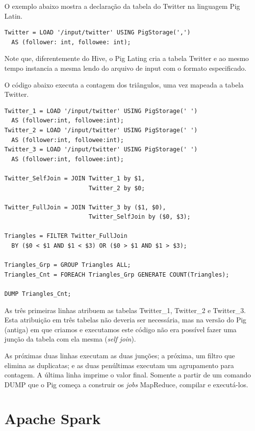 O exemplo abaixo mostra a declaração da tabela do Twitter na linguagem Pig Latin.

\begin{verbatim}
Twitter = LOAD '/input/twitter' USING PigStorage(',') 
  AS (follower: int, followee: int);
\end{verbatim}

Note que, diferentemente do Hive, o Pig Lating cria a tabela Twitter e ao mesmo tempo instancia 
a mesma lendo do arquivo de input com o formato especificado.

O código abaixo executa a contagem dos triângulos, uma vez mapeada a tabela Twitter.

\begin{verbatim}
Twitter_1 = LOAD '/input/twitter' USING PigStorage(' ') 
  AS (follower:int, followee:int);
Twitter_2 = LOAD '/input/twitter' USING PigStorage(' ') 
  AS (follower:int, followee:int);
Twitter_3 = LOAD '/input/twitter' USING PigStorage(' ') 
  AS (follower:int, followee:int);

Twitter_SelfJoin = JOIN Twitter_1 by $1, 
                        Twitter_2 by $0;

Twitter_FullJoin = JOIN Twitter_3 by ($1, $0), 
                        Twitter_SelfJoin by ($0, $3);

Triangles = FILTER Twitter_FullJoin 
  BY ($0 < $1 AND $1 < $3) OR ($0 > $1 AND $1 > $3);

Triangles_Grp = GROUP Triangles ALL;
Triangles_Cnt = FOREACH Triangles_Grp GENERATE COUNT(Triangles);

DUMP Triangles_Cnt;
\end{verbatim}

As três primeiras linhas atribuem as tabelas Twitter\_1, Twitter\_2 e Twitter\_3. Esta atribuição 
em três tabelas não deveria ser necessária, mas na versão do Pig (antiga) em que criamos e executamos
este código não era possível fazer uma junção da tabela com ela mesma (\emph{self join}).

As próximas duas linhas executam as duas junções; a próxima, um filtro que elimina as duplicatas;
e as duas penúltimas executam um agrupamento para contagem. A última linha imprime o valor final.
Somente a partir de um comando DUMP que o Pig começa a construir os \textit{jobs} MapReduce, compilar
e executá-los.

\section{Apache Spark}

